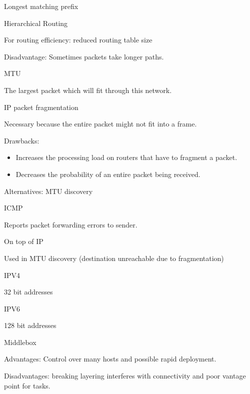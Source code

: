 \documentclass[main.tex]{subfiles}
\begin{document}
\begin{card}{Longest matching prefix}
\TODO
\end{card}

\begin{card}{Hierarchical Routing}
\item For routing efficiency: reduced routing table size
\item Disadvantage: Sometimes packets take longer paths.
\end{card}

\begin{card}{MTU}
\item The largest packet which will fit through this network.
\end{card}

\begin{card}{IP packet fragmentation}
\item Necessary because the entire packet might not fit into a frame.
\item Drawbacks:
    \begin{itemize}
        \item Increases the processing load on routers that have to fragment a packet.
        \item Decreases the probability of an entire packet being received.
    \end{itemize}
\item Alternatives: MTU discovery
\end{card}

\begin{card}{ICMP}
\item Reports packet forwarding errors to sender.
\item On top of IP
\item Used in MTU discovery (destination unreachable due to fragmentation)
\end{card}

\begin{card}{IPV4}
\item 32 bit addresses
\end{card}

\begin{card}{IPV6}
\item 128 bit addresses
\end{card}

\begin{card}{Middlebox}
\item Advantages: Control over many hosts and possible rapid deployment.
\item Disadvantages: breaking layering interferes with connectivity and poor vantage point for tasks.
\end{card}
\end{document}
